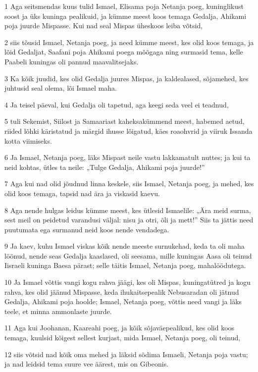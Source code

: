 \par 1 Aga seitsmendas kuus tulid Ismael, Elisama poja Netanja poeg, kuninglikust soost ja üks kuninga pealikuid, ja kümme meest koos temaga Gedalja, Ahikami poja juurde Mispasse. Kui nad seal Mispas üheskoos leiba võtsid,
\par 2 siis tõusid Ismael, Netanja poeg, ja need kümme meest, kes olid koos temaga, ja lõid Gedaljat, Saafani poja Ahikami poega mõõgaga ning surmasid tema, kelle Paabeli kuningas oli pannud maavalitsejaks.
\par 3 Ka kõik juudid, kes olid Gedalja juures Mispas, ja kaldealased, sõjamehed, kes juhtusid seal olema, lõi Ismael maha.
\par 4 Ja teisel päeval, kui Gedalja oli tapetud, aga keegi seda veel ei teadnud,
\par 5 tuli Sekemist, Siilost ja Samaariast kaheksakümmend meest, habemed aetud, riided lõhki käristatud ja märgid ihusse lõigatud, käes roaohvrid ja viiruk Issanda kotta viimiseks.
\par 6 Ja Ismael, Netanja poeg, läks Mispast neile vastu lakkamatult nuttes; ja kui ta neid kohtas, ütles ta neile: „Tulge Gedalja, Ahikami poja juurde!”
\par 7 Aga kui nad olid jõudnud linna keskele, siis Ismael, Netanja poeg, ja mehed, kes olid koos temaga, tapsid nad ära ja viskasid kaevu.
\par 8 Aga nende hulgas leidus kümme meest, kes ütlesid Ismaelile: „Ära meid surma, sest meil on peidetud varandusi väljal: nisu ja otri, õli ja mett!” Siis ta jättis need puutumata ega surmanud neid koos nende vendadega.
\par 9 Ja kaev, kuhu Ismael viskas kõik nende meeste surnukehad, keda ta oli maha löönud, nende seas Gedalja kaaslased, oli seesama, mille kuningas Aasa oli teinud Iisraeli kuninga Baesa pärast; selle täitis Ismael, Netanja poeg, mahalöödutega.
\par 10 Ja Ismael võttis vangi kogu rahva jäägi, kes oli Mispas, kuningatütred ja kogu rahva, kes olid jäänud Mispasse, keda ihukaitsepealik Nebusaradan oli jätnud Gedalja, Ahikami poja hoolde; Ismael, Netanja poeg, võttis need vangi ja läks teele, et minna ammonlaste juurde.
\par 11 Aga kui Joohanan, Kaareahi poeg, ja kõik sõjaväepealikud, kes olid koos temaga, kuulsid kõigest sellest kurjast, mida Ismael, Netanja poeg, oli teinud,
\par 12 siis võtsid nad kõik oma mehed ja läksid sõdima Ismaeli, Netanja poja vastu; ja nad leidsid tema suure vee äärest, mis on Gibeonis.
